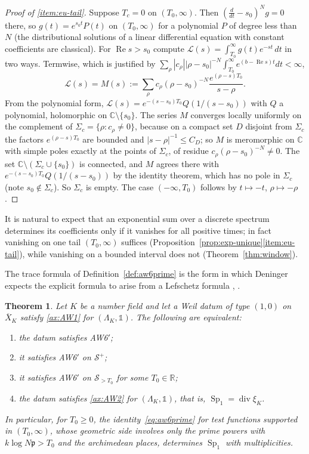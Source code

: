 \documentclass[11pt]{amsart}
\theoremstyle{plain}
\newtheorem{theorem}{Theorem}[section]
\theoremstyle{definition}
\theoremstyle{remark}
\numberwithin{equation}{section}
\newcommand{\C}{\mathbb{C}}
\newcommand{\R}{\mathbb{R}}
\newcommand{\Xbar}{\overline{X}}
\DeclareMathOperator{\divisor}{div}
\DeclareMathOperator{\Rea}{Re}
\renewcommand{\Re}{\Rea}
\begin{document}
\begin{proof}[Proof of \ref{item:eu-tail}]
Suppose $T_c=0$ on $(T_0,\infty)$. Then $(\frac d{dt}-s_0)^Ng=0$ there,
so $g(t)=e^{s_0t}P(t)$ on $(T_0,\infty)$ for a polynomial $P$ of degree
less than $N$ (the distributional solutions of a linear differential
equation with constant coefficients are classical). For $\Re s>s_0$
compute $\mathcal L(s)=\int_{T_0}^\infty g(t)e^{-st}\,dt$ in two ways.
Termwise, which is justified by $\sum_\rho|c_\rho||\rho-s_0|^{-N}
\int_{T_0}^\infty e^{(b-\Re s)t}dt<\infty$,
\[
\mathcal L(s)=M(s):=\sum_\rho c_\rho(\rho-s_0)^{-N}
\frac{e^{(\rho-s)T_0}}{s-\rho}.
\]
From the polynomial form, $\mathcal L(s)=e^{-(s-s_0)T_0}Q(1/(s-s_0))$
with $Q$ a polynomial, holomorphic on $\C\setminus\{s_0\}$. The series
$M$ converges locally uniformly on the complement of
$\Sigma_c=\{\rho:c_\rho\ne0\}$, because on a compact set $D$ disjoint
from $\Sigma_c$ the factors $e^{(\rho-s)T_0}$ are bounded and
$|s-\rho|^{-1}\le C_D$; so $M$ is meromorphic on $\C$ with simple poles
exactly at the points of $\Sigma_c$, of residue
$c_\rho(\rho-s_0)^{-N}\ne0$. The set $\C\setminus(\Sigma_c\cup\{s_0\})$
is connected, and $M$ agrees there with
$e^{-(s-s_0)T_0}Q(1/(s-s_0))$ by the identity theorem, which has no
pole in $\Sigma_c$ (note $s_0\notin\Sigma_c$). So $\Sigma_c$ is empty.
The case $(-\infty,T_0)$ follows by $t\mapsto-t$, $\rho\mapsto-\rho$.
\end{proof}

It is natural to expect that an exponential sum over a discrete
spectrum determines its coefficients only if it vanishes for all
positive times; in fact vanishing on one tail $(T_0,\infty)$ suffices
(Proposition~\ref{prop:exp-unique}\ref{item:eu-tail}), while
vanishing on a bounded interval does not (Theorem~\ref{thm:window}).

The trace formula of Definition~\ref{def:aw6prime} is the form in which
Deninger expects the explicit formula to arise from a Lefschetz formula
\cite[(10), p.~172]{Deninger1998Analogies},
\cite[(19), p.~16]{Deninger2001NumberTheory}.

\begin{theorem}\label{thm:aw6-div}
Let $K$ be a number field and let a Weil datum of type $(1,0)$ on
$\Xbar_K$ satisfy \ref{ax:AW1} for $(\Lambda_K,\mathbb 1)$. The
following are equivalent:
\begin{enumerate}[label=(\roman*)]
\item\label{item:ad-two} the datum satisfies AW6$'$;
\item\label{item:ad-one} it satisfies AW6$'$ on $\mathcal S^+$;
\item\label{item:ad-tail} it satisfies AW6$'$ on $\mathcal S_{>T_0}$
  for some $T_0\in\R$;
\item\label{item:ad-div} the datum satisfies \ref{ax:AW2} for
  $(\Lambda_K,\mathbb 1)$, that is,
  $\operatorname{Sp}_1=\divisor\xi_K$.
\end{enumerate}
In particular, for $T_0\ge0$, the identity~\eqref{eq:aw6prime} for
test functions supported in $(T_0,\infty)$, whose geometric side
involves only the prime powers with $k\log N\mathfrak p>T_0$ and the
archimedean places, determines $\operatorname{Sp}_1$ with multiplicities.
\end{theorem}
\end{document}
